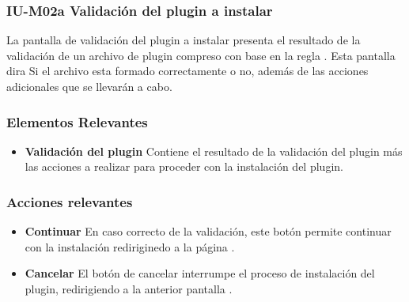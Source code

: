 
\subsubsection{IU-M02a Validación del plugin a instalar}

 La pantalla de validación del plugin a instalar presenta el resultado de la validación de un
 archivo de plugin compreso con base en la regla . Esta pantalla dira Si el archivo
 esta formado correctamente o no, además de las acciones adicionales que se llevarán a cabo.


\subsubsection{Elementos Relevantes}

    \begin{itemize}
    \item {\bf Validación del plugin}
        Contiene el resultado de la validación del plugin más las acciones
        a realizar para proceder con la instalación del plugin.

    \end{itemize}

\subsubsection{Acciones relevantes}

    \begin{itemize}
    \item {\bf Continuar}
        En caso correcto de la validación, este botón permite continuar con la instalación
        rediriginedo a la página .

    \item {\bf Cancelar}
        El botón de cancelar interrumpe el proceso de instalación del plugin, redirigiendo
        a la anterior pantalla .
    \end{itemize}

\clearpage
